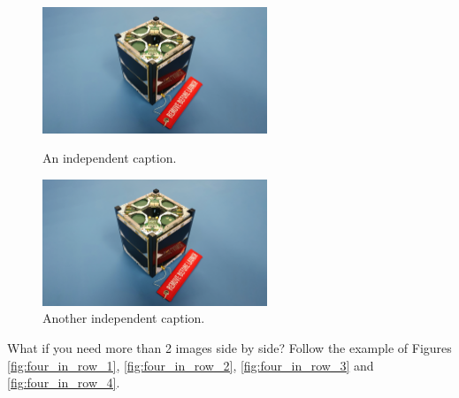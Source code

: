 \begin{figure}[!htb]
    \centering
    \begin{minipage}{.45\linewidth}
        \centering
        \includegraphics[width=0.6\textwidth]{images/istsat1.jpeg}
        \caption{An independent caption.}
		\label{fig:minipage_env_1}
    \end{minipage}
    \begin{minipage}{.45\linewidth}
        \centering
        \includegraphics[width=0.6\textwidth]{images/istsat1.jpeg}
        \caption{Another independent caption.}
		\label{fig:minipage_env_2}
    \end{minipage}
\end{figure}

What if you need more than 2 images side by side? Follow the example of Figures \ref{fig:four_in_row_1}, \ref{fig:four_in_row_2}, \ref{fig:four_in_row_3} and \ref{fig:four_in_row_4}.

